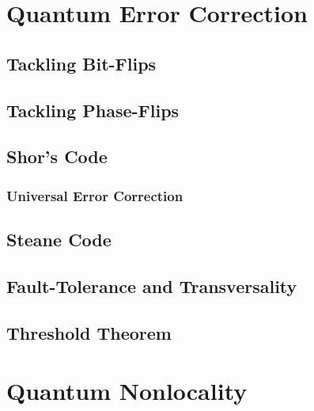 \chapter{Quantum Error Correction} %

    \section{Tackling Bit-Flips} %

    \section{Tackling Phase-Flips} %

    \section{Shor's Code} %

        \subsection{Universal Error Correction} %

    \section{Steane Code} %

    \section{Fault-Tolerance and Transversality} %

    \section{Threshold Theorem} %

\chapter{Quantum Nonlocality} %

